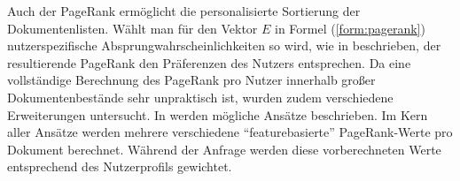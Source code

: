 Auch der PageRank ermöglicht die personalisierte Sortierung der Dokumentenlisten. Wählt man für den Vektor $E$ in Formel (\ref{form:pagerank}) nutzerspezifische Absprungwahrscheinlichkeiten so wird, wie in \citep{pagerank} beschrieben, der resultierende PageRank den Präferenzen des Nutzers entsprechen. Da eine vollständige Berechnung des PageRank pro Nutzer innerhalb großer Dokumentenbestände sehr unpraktisch ist, wurden zudem verschiedene Erweiterungen untersucht. In \citep{ilprints596} werden mögliche Ansätze beschrieben. Im Kern aller Ansätze werden mehrere verschiedene ``featurebasierte'' PageRank-Werte pro Dokument berechnet. Während der Anfrage werden diese vorberechneten Werte entsprechend des Nutzerprofils gewichtet. \citep{ilprints596} %

